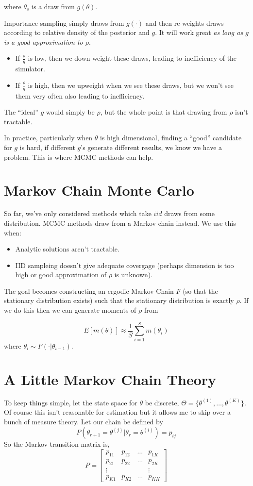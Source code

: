 \documentclass[twoside]{article}
\begin{document}
where $\theta_s$ is a draw from $g(\theta)$. 

Importance sampling simply draws from $g(\cdot)$ and then re-weights draws according to relative density of the posterior and $g$. It
will work great \emph{as long as $g$ is a good approximation to $\rho$}. 
\begin{itemize}
\item If $\frac{\rho}{g}$ is low, then we down weight these draws, leading to inefficiency of the simulator. 
\item If $\frac{\rho}{g}$ is high, then we upweight when we see these draws, but we won't see them very often also leading to inefficiency. 
\end{itemize}

The ``ideal'' $g$ would simply be $\rho$, but the whole point is that drawing from $\rho$ isn't tractable. 

In practice, particularly when $\theta$ is high dimensional, finding a ``good'' candidate for $g$ is hard, if different $g$'s generate different results, we know we have a problem. This is where MCMC methods can help.

\section{Markov Chain Monte Carlo}

So far, we've only considered methods which take $iid$ draws from some distribution. MCMC methods draw from a Markov chain instead. 
We use this when: 
\begin{itemize}
\item Analytic solutions aren't tractable. 
\item IID sampleing doesn't give adequate covergage (perhaps dimension is too high or good approximation of $\rho$ is unknown). 
\end{itemize}
The goal becomes constructing an ergodic Markov Chain $F$ (so that the stationary distribution exists) such that the stationary
distribution is exactly $\rho$.  If we do this then we can generate moments of $\rho$ from

$$ E[m(\theta)] \approx \frac{1}{S} \sum_{i=1}^S m(\theta_i) $$
where $\theta_i \sim F(\cdot | \theta_{i-1})$. 

\section{A Little Markov Chain Theory}

To keep things simple, let the state space for $\theta$ be discrete, $\Theta = \{\theta^{(1)}, \ldots, \theta^{(K)} \}$. Of course this isn't reasonable for estimation but it allows me to 
skip over a bunch of measure theory.  Let our chain be defined by
$$P(\theta_{r+1} = \theta^{(j)} | \theta_r = \theta^{(i)}) = p_{ij} $$
So the Markov transition matrix is, 
$$P = \begin{bmatrix} p_{11} & p_{12} & \ldots & p_{1K} \\
 p_{21} & p_{22} & \ldots&  p_{2K} \\
 \vdots & & & \vdots \\
 p_{K1} & p_{K2} & \ldots&  p_{KK} \end{bmatrix}$$
\end{document}
